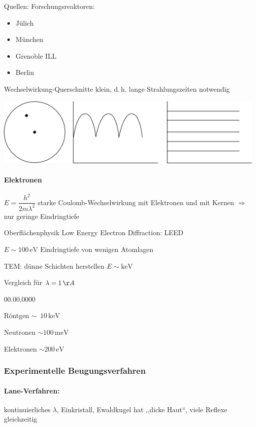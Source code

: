 Quellen: Forschungsreaktoren:
\begin{itemize}
\item J\"ulich
\item M\"unchen
\item Grenoble ILL
\item Berlin
\end{itemize}
Wechselwirkung-Querschnitte klein, d.\,h. lange Strahlungszeiten
notwendig

\includegraphics[scale=1]{images/2009-11-05-neutronen.png}


\paragraph{Elektronen}

$E=\dfrac{h^{2}}{2m\lambda^{2}}$ starke Coulomb-Wechselwirkung mit
Elektronen und mit Kernen $\Rightarrow$ nur geringe Eindringtiefe

Oberfl\"achenphysik Low Energy Electron Diffraction: LEED

$E\sim100\,\text{eV}$ Eindringtiefe von wenigen Atomlagen

TEM: d\"unne Schichten herstellen $E\sim\text{keV}$

Vergleich f\"ur $\lambda=1\,\AA$
\begin{labeling}{00.00.0000}
\item [{R\"ontgen}] $\sim\phantom{0}10\,\text{keV}$
\item [{Neutronen}] $\sim100\,\text{meV}$
\item [{Elektronen}] $\sim200\,\text{eV}$
\end{labeling}

\subsubsection{Experimentelle Beugungsverfahren}


\paragraph{Lane-Verfahren: }

kontinuierliches $\lambda$, Einkristall, Ewaldkugel hat ,,dicke
Haut{}``, viele Reflexe gleichzeitig

